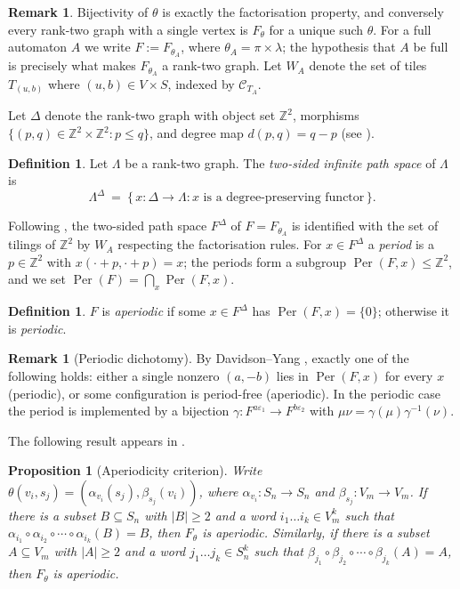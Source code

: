 \documentclass[11pt,reqno]{amsart}
\theoremstyle{plain}
\newtheorem{proposition}[theorem]{Proposition}
\theoremstyle{definition}
\newtheorem{definition}[theorem]{Definition}
\newtheorem{remark}[theorem]{Remark}
\newcommand{\ZZ}{\mathbb{Z}}
\newcommand{\Per}{\operatorname{Per}}
\newcommand{\eps}{\varepsilon}
\begin{document}
\begin{remark}\label{rem:onevertex}
Bijectivity of $\theta$ is exactly the factorisation property, and conversely every
rank-two graph with a single vertex is $F_\theta$ for a unique such $\theta$. For a
full automaton $A$ we write $F:=F_{\theta_A}$, where $\theta_A=\pi\times\lambda$; the
hypothesis that $A$ be full is precisely what makes $F_{\theta_A}$ a rank-two graph. Let $W_A$ denote the set of tiles $T_{(u,b)}$ where $(u,b) \in V \times S$, indexed by $\mathcal{C}_{T_A}$.
\end{remark}

\noindent
Let $\Delta$ denote the rank-two graph with object set $\ZZ^2$, morphisms
$\{(p,q)\in\ZZ^2\times\ZZ^2:p\le q\}$, and degree map $d(p,q)=q-p$ (see \cite{KP}).

\begin{definition}
Let $\Lambda$ be a rank-two graph. The \emph{two-sided infinite path space} of
$\Lambda$ is
\[
\Lambda^\Delta ~=~ \{\, x:\Delta\to\Lambda : x \text{ is a degree-preserving
functor}\,\}.
\]
\end{definition}

Following \cite{KP}, the two-sided path space $F^\Delta$ of $F=F_{\theta_A}$ is
identified with the set of tilings of $\ZZ^2$ by $W_A$ respecting the
factorisation rules. For $x\in F^\Delta$ a \emph{period} is a $p\in\ZZ^2$ with
$x(\cdot+p,\cdot+p)=x$; the periods form a subgroup $\Per(F,x)\le\ZZ^2$, and we set
$\Per(F)=\bigcap_x\Per(F,x)$.

\begin{definition}\label{def:aper}
$F$ is \emph{aperiodic} if some $x\in F^\Delta$ has $\Per(F,x)=\{0\}$; otherwise it
is \emph{periodic}.
\end{definition}

\begin{remark}[Periodic dichotomy] \label{rmk:aperiod}
By Davidson--Yang \cite[Theorem~3.1]{DY}, exactly one of
the following holds: either a single nonzero $(a,-b)$ lies in $\Per(F,x)$ for every
$x$ (periodic), or some configuration is period-free (aperiodic). In the periodic
case the period is implemented by a bijection $\gamma\colon F^{a\eps_1}\to
F^{b\eps_2}$ with $\mu\nu=\gamma(\mu)\gamma^{-1}(\nu)$.
\end{remark}

\noindent
The following result appears in \cite[Corollary 4.1]{DY}.

\begin{proposition}[Aperiodicity criterion]\label{prp:aperiod}
Write $\theta(v_i,s_j)=(\alpha_{v_i}(s_j),\beta_{s_j}(v_i))$, where
$\alpha_{v_i}\colon S_n\to S_n$ and $\beta_{s_j}\colon V_m\to V_m$. If there is a
subset $B\subseteq S_n$ with $|B|\ge2$ and a word $i_1\ldots i_k\in V_m^k$ such that
$\alpha_{i_1}\circ\alpha_{i_2}\circ\cdots\circ\alpha_{i_k}(B)=B$, then $F_\theta$ is
aperiodic. Similarly, if there is a subset $A\subseteq V_m$ with $|A|\ge2$ and a word
$j_1\ldots j_k\in S_n^k$ such that
$\beta_{j_1}\circ\beta_{j_2}\circ\cdots\circ\beta_{j_k}(A)=A$, then $F_\theta$ is
aperiodic.
\end{proposition}
\end{document}
